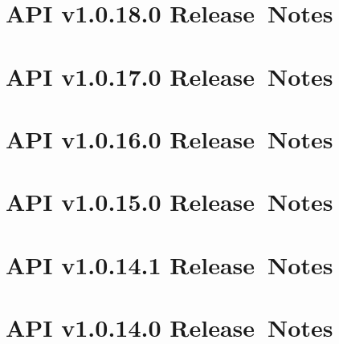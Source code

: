 \documentclass{memoir}%
\begin{document}
\paragraph*{}%

%
\section*{API v1.0.18.0 Release~Notes}%
\paragraph*{}%

%
\section*{API v1.0.17.0 Release~Notes}%
\paragraph*{}%

%
\section*{API v1.0.16.0 Release~Notes}%
\paragraph*{}%

%
\section*{API v1.0.15.0 Release~Notes}%
\paragraph*{}%

%
\section*{API v1.0.14.1 Release~Notes}%
\paragraph*{}%

%
\section*{API v1.0.14.0 Release~Notes}%
\paragraph*{}%
\end{document}
